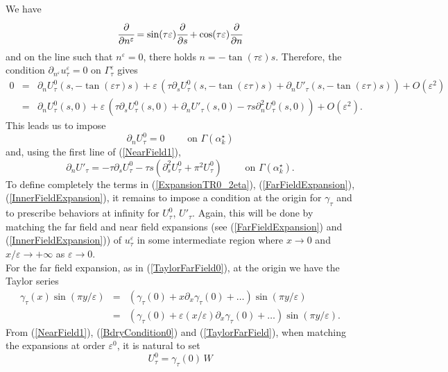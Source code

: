 \documentclass[11pt,a4paper]{article}
\newcommand{\eps}{\varepsilon}
\begin{document}
\noindent We have
\[
\cfrac{\partial}{\partial n^\eps}=\sin(\tau\eps)\cfrac{\partial}{\partial s}+\cos(\tau\eps)\cfrac{\partial}{\partial n}
\]
and on the line such that $n^\eps=0$, there holds $n=-\tan(\tau\eps)s$. Therefore, the condition 
$\partial_{n^\eps}u^\eps_\tau=0$ on $\Gamma^\eps_\tau$ gives
\[
\begin{array}{rcl}
0&=&\partial_nU^0_\tau(s,-\tan(\eps\tau)s)+\eps\,(\tau\partial_sU^0_\tau(s,-\tan(\eps\tau)s)+\partial_nU'_\tau(s,-\tan(\eps\tau)s))+O(\eps^2)\\[3pt]
&=&\partial_nU^0_\tau(s,0)+\eps\,(\tau\partial_sU^0_\tau(s,0)+\partial_nU'_\tau(s,0)-\tau s\partial^2_nU^0_\tau(s,0))+O(\eps^2).
\end{array}
\]
This leads us to impose 
\begin{equation}\label{BdryCondition0}
\partial_nU^0_\tau=0\qquad\mbox{ on }\Gamma(\alpha^\star_k)
\end{equation}
and, using the first line of (\ref{NearField1}), 
\begin{equation}\label{BdryConditionP}
\partial_nU'_\tau=-\tau\partial_sU^0_\tau-\tau s(\partial^2_sU^0_\tau+\pi^2U^0_\tau)\qquad\mbox{ on }\Gamma(\alpha^\star_k).
\end{equation}
To define completely the terms in (\ref{ExpansionTR0_2eta}), 
(\ref{FarFieldExpansion}), (\ref{InnerFieldExpansion}), it remains to impose a condition at the origin for $\gamma_\tau$ and to prescribe behaviors at infinity for $U^0_\tau$, $U'_\tau$. Again, this will be done by matching the far field and near field expansions (see (\ref{FarFieldExpansion}) and (\ref{InnerFieldExpansion})) of $u^\eps_\tau$ in some intermediate region where $x\to0$ and $x/\eps\to+\infty$ as $\eps\to0$.\\ 
\newline
For the far field expansion, as in (\ref{TaylorFarField0}), at the origin we have the Taylor series
\begin{equation}\label{TaylorFarField}
\begin{array}{rcl}
\gamma_\tau(x)\sin(\pi y/\eps) &= &(\gamma_\tau(0)+x\partial_x\gamma_\tau(0)+\dots)\sin(\pi y/\eps) \\[4pt]
&= &(\gamma_\tau(0)+\eps (x/\eps)\partial_x\gamma_\tau(0)+\dots)\sin(\pi y/\eps).
\end{array}
\end{equation}
From (\ref{NearField1}), (\ref{BdryCondition0}) and (\ref{TaylorFarField}), when matching the expansions at order $\eps^0$, it is natural to set 
\begin{equation}\label{IdentiTerm1}
U^0_{\tau}=\gamma_\tau(0)\,W
\end{equation}
\end{document}
